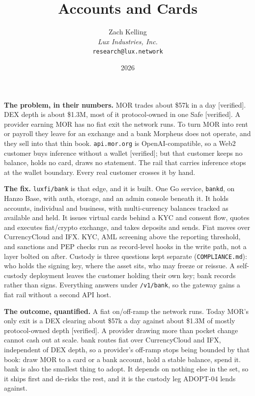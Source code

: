 \documentclass[11pt,a4paper]{article}
\title{Accounts and Cards}
\author{Zach Kelling\\\textit{Lux Industries, Inc.}\\\texttt{research@lux.network}}
\date{2026}
\newcommand{\code}[1]{\texttt{\small #1}}
\begin{document}
\luxcoverpage
\sloppy


\noindent\textbf{The problem, in their numbers.}
MOR trades about \$57k in a day [verified]. DEX depth is about \$1.3M, most of it
protocol-owned in one Safe [verified]. A provider earning MOR has no fiat exit the network runs. To
turn MOR into rent or payroll they leave for an exchange and a bank Morpheus does not operate, and
they sell into that thin book. \code{api.mor.org} is OpenAI-compatible, so a Web2 customer buys
inference without a wallet [verified]; but that customer keeps no balance, holds no card, draws no
statement. The rail that carries inference stops at the wallet boundary. Every real customer crosses
it by hand.

\vspace{0.35ex}
\noindent\textbf{The fix.}
\code{luxfi/bank} is that edge, and it is built. One Go service, \code{bankd}, on Hanzo Base, with
auth, storage, and an admin console beneath it. It holds accounts, individual and business, with
multi-currency balances tracked as available and held. It issues virtual cards behind a KYC and
consent flow, quotes and executes fiat/crypto exchange, and takes deposits and sends. Fiat moves over
CurrencyCloud and IFX. KYC, AML screening above the reporting threshold, and sanctions and PEP checks
run as record-level hooks in the write path, not a layer bolted on after. Custody is three questions
kept separate (\code{COMPLIANCE.md}): who holds the signing key, where the asset sits, who may freeze
or reissue. A self-custody deployment leaves the customer holding their own key; bank records rather
than signs. Everything answers under \code{/v1/bank}, so the gateway gains a fiat rail without a
second API host.

\vspace{0.35ex}
\noindent\textbf{The outcome, quantified.}
A fiat on/off-ramp the network runs. Today MOR's only exit is a DEX clearing about \$57k a day
against about \$1.3M of mostly protocol-owned depth [verified]. A provider drawing more than pocket
change cannot cash out at scale. bank routes fiat over CurrencyCloud and IFX, independent of DEX
depth, so a provider's off-ramp stops being bounded by that book: draw MOR to a card or a bank
account, hold a stable balance, spend it. bank is also the smallest thing to adopt. It depends on
nothing else in the set, so it ships first and de-risks the rest, and it is the custody leg ADOPT-04
lends against.
\end{document}
